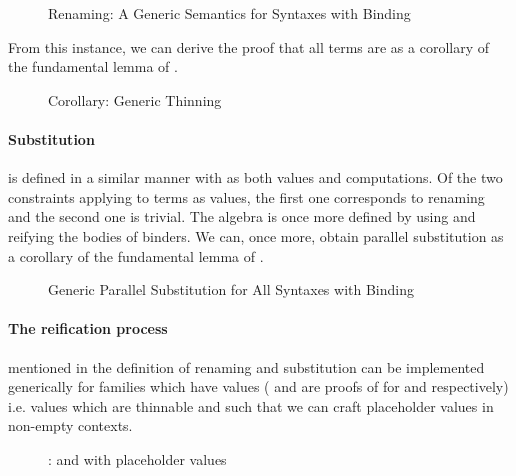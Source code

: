 \begin{figure}[h]
\caption{Renaming: A Generic Semantics for Syntaxes with Binding\label{fig:genrensem}}
\end{figure}

From this instance, we can derive the proof that all terms are  as
a corollary of the fundamental lemma of .

\begin{figure}[h]
\caption{Corollary: Generic Thinning\label{fig:genren}}
\end{figure}

\paragraph{Substitution} is defined in a similar manner with  as both values and computations.
Of the two constraints applying to terms as values, the first one corresponds to renaming
and the second one is trivial. The algebra is once more defined by using  and
reifying the bodies of binders. We can, once more, obtain parallel substitution as a
corollary of the fundamental lemma of .

\begin{figure}[h]
\caption{Generic Parallel Substitution for All Syntaxes with Binding\label{fig:gensub}}
\end{figure}

\paragraph{The reification process} mentioned in the definition of renaming and substitution
can be implemented generically for  families which have 
values ( and  are proofs of
 for  and  respectively) i.e. values which are thinnable
and such that we can craft placeholder values in non-empty contexts.

\begin{figure}[h]
\caption{:  and with placeholder values}
\end{figure}

